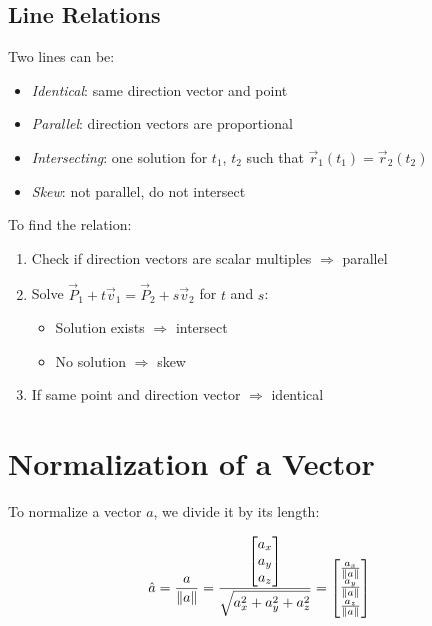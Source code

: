 \subsection{Line Relations}

Two lines can be:

\begin{itemize}

	\item \emph{Identical}: same direction vector and point

	\item \emph{Parallel}: direction vectors are proportional

	\item \emph{Intersecting}: one solution for \(t_1\), \(t_2\) such that \(\vec{r}_1(t_1) = \vec{r}_2(t_2)\)

	\item \emph{Skew}: not parallel, do not intersect

\end{itemize}

To find the relation:

\begin{enumerate}

	\item Check if direction vectors are scalar multiples \(\Rightarrow\) parallel

	\item Solve \(\vec{P}_1 + t\vec{v}_1 = \vec{P}_2 + s\vec{v}_2\) for \(t\) and \(s\):

	\begin{itemize}

		\item Solution exists \(\Rightarrow\) intersect

		\item No solution \(\Rightarrow\) skew

	\end{itemize}

	\item If same point and direction vector \(\Rightarrow\) identical

\end{enumerate}

\section{Normalization of a Vector}

To normalize a vector \(a\), we divide it by its length:

\[
	\hat{a} = \frac{a}{\left\| a \right\|} = \frac{\begin{bmatrix} a_x \\ a_y \\ a_z \end{bmatrix}}{\sqrt{a_x^2 + a_y^2 + a_z^2}} = 
	\begin{bmatrix} \frac{a_x}{\left\| a \right\|} \\ \frac{a_y}{\left\| a \right\|} \\ \frac{a_z}{\left\| a \right\|} \end{bmatrix}
\]

